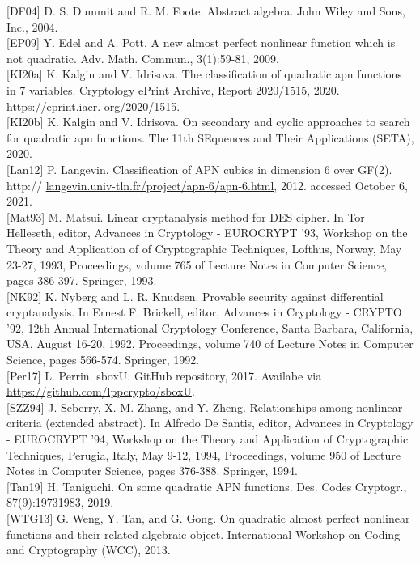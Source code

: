 \documentclass[10pt]{article}
\begin{document}
[DF04] D. S. Dummit and R. M. Foote. Abstract algebra. John Wiley and Sons, Inc., 2004.\\[0pt]
[EP09] Y. Edel and A. Pott. A new almost perfect nonlinear function which is not quadratic. Adv. Math. Commun., 3(1):59-81, 2009.\\[0pt]
[KI20a] K. Kalgin and V. Idrisova. The classification of quadratic apn functions in 7 variables. Cryptology ePrint Archive, Report 2020/1515, 2020. \href{https://eprint.iacr}{https://eprint.iacr}. org/2020/1515.\\[0pt]
[KI20b] K. Kalgin and V. Idrisova. On secondary and cyclic approaches to search for quadratic apn functions. The 11th SEquences and Their Applications (SETA), 2020.\\[0pt]
[Lan12] P. Langevin. Classification of APN cubics in dimension 6 over GF(2). http:// \href{http://langevin.univ-tln.fr/project/apn-6/apn-6.html}{langevin.univ-tln.fr/project/apn-6/apn-6.html}, 2012. accessed October 6, 2021.\\[0pt]
[Mat93] M. Matsui. Linear cryptanalysis method for DES cipher. In Tor Helleseth, editor, Advances in Cryptology - EUROCRYPT '93, Workshop on the Theory and Application of of Cryptographic Techniques, Lofthus, Norway, May 23-27, 1993, Proceedings, volume 765 of Lecture Notes in Computer Science, pages 386-397. Springer, 1993.\\[0pt]
[NK92] K. Nyberg and L. R. Knudsen. Provable security against differential cryptanalysis. In Ernest F. Brickell, editor, Advances in Cryptology - CRYPTO '92, 12th Annual International Cryptology Conference, Santa Barbara, California, USA, August 16-20, 1992, Proceedings, volume 740 of Lecture Notes in Computer Science, pages 566-574. Springer, 1992.\\[0pt]
[Per17] L. Perrin. sboxU. GitHub repository, 2017. Availabe via \href{https://github.com/lppcrypto/sboxU}{https://github.com/lppcrypto/sboxU}.\\[0pt]
[SZZ94] J. Seberry, X. M. Zhang, and Y. Zheng. Relationships among nonlinear criteria (extended abstract). In Alfredo De Santis, editor, Advances in Cryptology - EUROCRYPT '94, Workshop on the Theory and Application of Cryptographic Techniques, Perugia, Italy, May 9-12, 1994, Proceedings, volume 950 of Lecture Notes in Computer Science, pages 376-388. Springer, 1994.\\[0pt]
[Tan19] H. Taniguchi. On some quadratic APN functions. Des. Codes Cryptogr., 87(9):19731983, 2019.\\[0pt]
[WTG13] G. Weng, Y. Tan, and G. Gong. On quadratic almost perfect nonlinear functions and their related algebraic object. International Workshop on Coding and Cryptography (WCC), 2013.\\[0pt]
\end{document}
